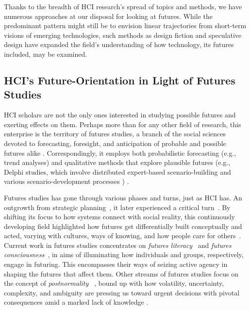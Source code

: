 Thanks to the breadth of HCI research's spread of topics and methods, we have numerous approaches at our disposal for looking at futures. While the predominant pattern might still be to envision linear trajectories from short-term visions of emerging technologies, such methods as design fiction and speculative design have expanded the field's understanding of how technology, its futures included, may be examined.  


\subsection{HCI's Future-Orientation in Light of Futures Studies}

HCI scholars are not the only ones interested in studying possible futures and exerting effects on them. Perhaps more than for any other field of research, this enterprise is the territory of futures studies, a branch of the social sciences devoted to forecasting, foresight, and anticipation of probable and possible futures alike \cite{bellWhatWeMean1996}. Correspondingly, it employs both probabilistic forecasting (e.g., trend analyses) and qualitative methods that explore plausible futures (e.g., Delphi studies, which involve distributed expert-based scenario-building \cite{roweDelphiTechniqueForecasting1999} and various scenario-development processes \cite{vanderheijdenScenariosArtStrategic2005}) \cite{bell_purpose_2009}. 

Futures studies has gone through various phases and turns, just as HCI has. An outgrowth from strategic planning~\cite{bellWhatWeMean1996}, it later experienced a critical turn~\cite{slaughterKnowledgeBaseFutures1998}. By shifting its focus to how systems connect with social reality, this continuously developing 
field highlighted how futures get differentially built conceptually and acted, varying with cultures, ways of knowing, and how people care for others~\cite{sardar_colonizing_1993, adam_futures_2011, sardar_postnormal_2015}. 
Current work in futures studies concentrates on \textit{futures literacy}~\cite{millerFuturesLiteracyTransforming2018} and \textit{futures consciousness}~\cite{ahvenharjuFiveDimensionsFutures2018}, in aims of illuminating how individuals and groups, respectively, engage in futuring. This encompasses their ways of seizing active agency in shaping the futures that affect them. Other streams of futures studies focus on the concept of \textit{postnormality} ~\cite{funtowicz_science_1993, sardar_postnormal_2015}, bound up with how volatility, uncertainty, complexity, and ambiguity are pressing us toward urgent decisions with pivotal consequences amid a marked lack of knowledge \cite{sardar_postnormal_2015, slaughter_farewell_2020}. 


